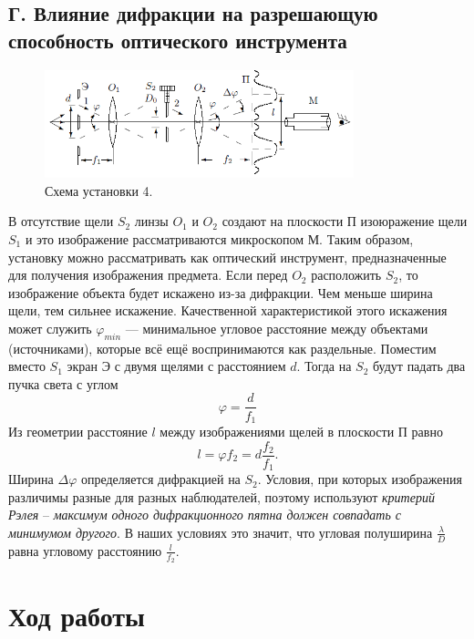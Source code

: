 \documentclass[a4paper,12pt]{article}
\begin{document}
\subsection*{Г. Влияние дифракции на разрешающую способность оптического инструмента}
\begin{figure}[h]
\includegraphics[width = 0.8\textwidth]{5.png}
\centering
\caption{Схема установки 4.}
\end{figure}
В отсутствие щели $S_2$ линзы $O_1$ и $O_2$ создают на плоскости П изоюражение щели $S_1$ и это изображение рассматриваются микроскопом М. Таким образом, установку можно рассматривать как оптический инструмент, предназначенные для получения изображения предмета. Если перед $O_2$ расположить $S_2$, то изображение объекта будет искажено из-за дифракции. Чем меньше ширина щели, тем сильнее искажение. Качественной характеристикой этого искажения может служить $\varphi_{min}$ --- минимальное угловое расстояние между объектами (источниками), которые всё ещё воспринимаются как раздельные. Поместим вместо $S_1$ экран Э с двумя щелями с расстоянием $d$. Тогда на $S_2$ будут падать два пучка света с углом
\begin{equation}
\varphi = \dfrac{d}{f_1}
\end{equation}
Из геометрии расстояние $l$ между изображениями щелей в плоскости П равно 
\begin{equation}
l = \varphi f_2 = d \dfrac{f_2}{f_1}.
\end{equation}
Ширина $\Delta \varphi$ определяется дифракцией на $S_2$. Условия, при которых изображения различимы разные для разных наблюдателей, поэтому используют \textit{критерий Рэлея} -- \textit{максимум одного дифракционного пятна должен совпадать с минимумом другого}. В наших условиях это значит, что угловая полуширина $\frac{\lambda}{D}$ равна угловому расстоянию $\frac{l}{f_2}$.
\newpage
\section*{Ход работы}
\end{document}
